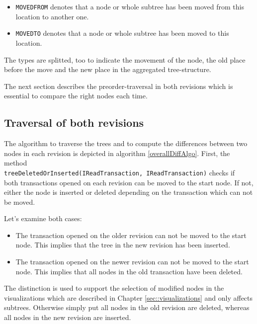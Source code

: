\begin{itemize}
\item \texttt{MOVEDFROM} denotes that a node or whole subtree has been moved from this location to another one.
\item \texttt{MOVEDTO} denotes that a node or whole subtree has been moved to this location.
\end{itemize}

The types are splitted, too to indicate the movement of the node, the old place before the move and the new place in the aggregated tree-structure.

The next section describes the preorder-traversal in both revisions which is essential to compare the right nodes each time.

\subsection{Traversal of both revisions}
The algorithm to traverse the trees and to compute the differences between two nodes in each revision is depicted in algorithm \ref{overallDiffAlgo}. First, the method\\ \texttt{treeDeletedOrInserted(IReadTransaction, IReadTransaction)} checks if\\ both transactions opened on each revision can be moved to the start node. If not, either the node is inserted or deleted depending on the transaction which can not be moved.

Let's examine both cases:
\begin{itemize}
\item
The transaction opened on the older revision can not be moved to the start node. This implies that the tree in the new revision has been inserted.
\item
The transaction opened on the newer revision can not be moved to the start node. This implies that all nodes in the old transaction have been deleted.
\end{itemize}

The distinction is used to support the selection of modified nodes in the visualizations which are described in Chapter \ref{sec::visualizations} and only affects subtrees. Otherwise simply put all nodes in the old revision are deleted, whereas all nodes in the new revision are inserted.

